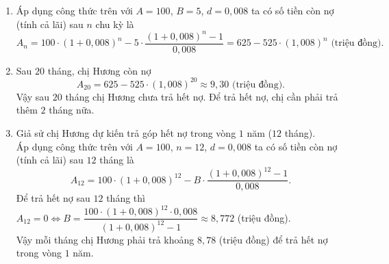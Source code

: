 \begin{ex}
{\begin{enumerate}
	\item Áp dụng công thức trên với $A=100$, $B=5$, $d=0{,}008$ ta có số tiền còn nợ (tính cả lãi) sau $n$ chu kỳ là
	$$A_n = 100 \cdot (1+0{,}008)^n - 5 \cdot \dfrac{(1+0{,}008)^n - 1}{0{,}008} = 625 - 525 \cdot (1{,}008)^n \text{ (triệu đồng).}$$
	\item Sau $20$ tháng, chị Hương còn nợ
	$$A_{20} = 625 - 525 \cdot (1{,}008)^{20} \approx 9{,}30 \text{ (triệu đồng).}$$
	Vậy sau $20$ tháng chị Hương chưa trả hết nợ. Để trả hết nợ, chị cần phải trả thêm $2$ tháng nữa.
	\item Giả sử chị Hương dự kiến trả góp hết nợ trong vòng $1$ năm ($12$ tháng).\\
	Áp dụng công thức trên với $A=100$, $n=12$, $d=0{,}008$ ta có số tiền còn nợ (tính cả lãi) sau $12$ tháng là
	$$A_{12} = 100 \cdot (1+0{,}008)^{12} - B \cdot \dfrac{(1+0{,}008)^{12} - 1}{0{,}008}.$$
	Để trả hết nợ sau $12$ tháng thì $A_{12} = 0 \Leftrightarrow B = \dfrac{100 \cdot (1+0{,}008)^{12} \cdot 0{,}008}{(1+0{,}008)^{12} - 1} \approx 8{,}772$ (triệu đồng).\\
	Vậy mỗi tháng chị Hương phải trả khoảng $8{,}78$ (triệu đồng) để trả hết nợ trong vòng $1$ năm.
\end{enumerate}

	}
\end{ex}